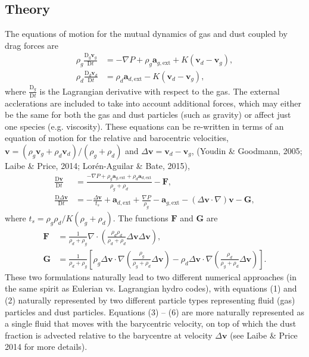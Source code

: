\documentclass[a4paper]{article}
\renewcommand{\vec}[1]{\ensuremath{\mathbf{#1}}}
\begin{document}
\subsection{Theory}
The equations of motion for the mutual dynamics of gas and dust coupled by drag forces are 
\begin{align}
\rho_g \frac{\mathrm{D}_g \vec{v}_g}{\mathrm{D} t} &= -\nabla P  + \rho_g \vec{a}_{g, \mathrm{ext}} 
                                                     + K (\vec{v}_d - \vec{v}_g),  \\
\rho_d \frac{\mathrm{D}_d \vec{v}_d}{\mathrm{D} t} &= \rho_d \vec{a}_{d, \mathrm{ext}} 
                                                     - K (\vec{v}_d - \vec{v}_g),
\end{align}
where $\frac{\mathrm{D}_g}{\mathrm{D} t}$ is the Lagrangian derivative with respect to the gas. The external acclerations are included to take into account additional forces, which may either be the same for both the gas and dust particles (such as gravity) or affect just one species (e.g. viscosity). These equations can be re-written in terms of an equation of motion for the relative and barocentric velocities, $\vec{v} = (\rho_g \vec{v}_g + \rho_d \vec{v}_d)/(\rho_g + \rho_d)$ and $\Delta \vec{v} = \vec{v}_d - \vec{v}_g$, (Youdin \& Goodmann, 2005; Laibe \& Price, 2014; Lor\'en-Aguilar \& Bate, 2015),
\begin{align}
\frac{\mathrm{D} \vec{v}}{\mathrm{D} t} &= \frac{-\nabla P + \rho_g \vec{a}_{g, \mathrm{ext}} + \rho_d \vec{a}_{d, \mathrm{ext}}}{\rho_g + \rho_d} - \vec{F}, \\
\frac{\mathrm{D} \Delta \vec{v}}{\mathrm{D} t} &= -  \frac{\Delta \vec{v}}{t_s}+  \vec{a}_{d, \mathrm{ext}} + \frac{\nabla P}{\rho_g}  - \vec{a}_{g, \mathrm{ext}} - (\Delta \vec{v} \cdot \nabla) \vec{v} - \vec{G},
\end{align}
where $t_s = \rho_g \rho_d / K(\rho_g + \rho_d)$. The functions $\vec{F}$ and $\vec{G}$ are
\begin{align}
\vec{F} &= \frac{1}{\rho_d + \rho_g} \nabla \cdot \left(\frac{\rho_d \rho_d}{\rho_d + \rho_d} \Delta \vec{v} \Delta \vec{v} \right), \\
\vec{G} &= \frac{1}{\rho_d + \rho_g} \left[ 
 \rho_g \Delta \vec{v} \cdot \nabla \left(\frac{\rho_g}{\rho_g + \rho_d} \Delta \vec{v} \right) - 
 \rho_d \Delta \vec{v} \cdot \nabla \left(\frac{\rho_d}{\rho_g + \rho_d} \Delta \vec{v} \right) \right].
\end{align}
These two formulations naturally lead to two different numerical approaches (in the same spirit as Eulerian vs. Lagrangian hydro codes), with equations (1) and (2) naturally represented by two different particle types representing fluid (gas) particles and dust particles. Equations (3) -- (6) are more naturally represented as a single fluid that moves with the barycentric velocity, on top of which the dust fraction is advected relative to the barycentre at velocity $\Delta \vec{v}$ (see Laibe \& Price 2014 for more details). 
\end{document}
